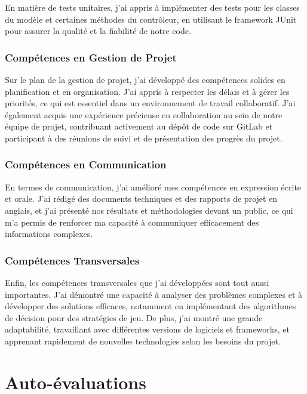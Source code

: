 En matière de tests unitaires, j'ai appris à implémenter des tests pour les classes du modèle et certaines méthodes du contrôleur, en utilisant le framework JUnit pour assurer la qualité et la fiabilité de notre code.

\subsubsection*{Compétences en Gestion de Projet}

Sur le plan de la gestion de projet, j'ai développé des compétences solides en planification et en organisation. J'ai appris à respecter les délais et à gérer les priorités, ce qui est essentiel dans un environnement de travail collaboratif. J'ai également acquis une expérience précieuse en collaboration au sein de notre équipe de projet, contribuant activement au dépôt de code sur GitLab et participant à des réunions de suivi et de présentation des progrès du projet.

\subsubsection*{Compétences en Communication}

En termes de communication, j'ai amélioré mes compétences en expression écrite et orale. J'ai rédigé des documents techniques et des rapports de projet en anglais, et j'ai présenté nos résultats et méthodologies devant un public, ce qui m'a permis de renforcer ma capacité à communiquer efficacement des informations complexes.

\subsubsection*{Compétences Transversales}

Enfin, les compétences transversales que j'ai développées sont tout aussi importantes. J'ai démontré une capacité à analyser des problèmes complexes et à développer des solutions efficaces, notamment en implémentant des algorithmes de décision pour des stratégies de jeu. De plus, j'ai montré une grande adaptabilité, travaillant avec différentes versions de logiciels et frameworks, et apprenant rapidement de nouvelles technologies selon les besoins du projet.


\section{Auto-évaluations}

